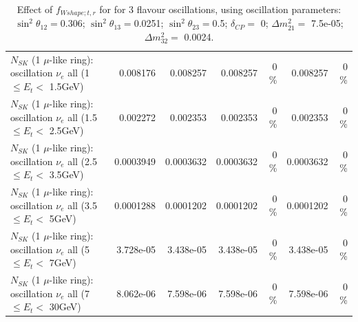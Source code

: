 \begin{table}
\begin{tabular}{| l | r | r | r  r | r  r |}
$N_{SK}$ (1 $\mu$-like ring): oscillation $\nu_{e}$ all (1 $\leq E_{t} <$ 1.5GeV) &        0.008176 &        0.008257 &        0.008257 &        0 \%  &        0.008257 &        0 \%  \\ 
$N_{SK}$ (1 $\mu$-like ring): oscillation $\nu_{e}$ all (1.5 $\leq E_{t} <$ 2.5GeV) &        0.002272 &        0.002353 &        0.002353 &        0 \%  &        0.002353 &        0 \%  \\ 
$N_{SK}$ (1 $\mu$-like ring): oscillation $\nu_{e}$ all (2.5 $\leq E_{t} <$ 3.5GeV) &       0.0003949 &       0.0003632 &       0.0003632 &        0 \%  &       0.0003632 &        0 \%  \\ 
$N_{SK}$ (1 $\mu$-like ring): oscillation $\nu_{e}$ all (3.5 $\leq E_{t} <$ 5GeV) &       0.0001288 &       0.0001202 &       0.0001202 &        0 \%  &       0.0001202 &        0 \%  \\ 
 $N_{SK}$ (1 $\mu$-like ring): oscillation $\nu_{e}$ all (5 $\leq E_{t} <$ 7GeV) &       3.728e-05 &       3.438e-05 &       3.438e-05 &        0 \%  &       3.438e-05 &        0 \%  \\ 
$N_{SK}$ (1 $\mu$-like ring): oscillation $\nu_{e}$ all (7 $\leq E_{t} <$ 30GeV) &       8.062e-06 &       7.598e-06 &       7.598e-06 &        0 \%  &       7.598e-06 &        0 \%  \\ 
\hline
\hline
\end{tabular}
\caption{ Effect of $f_{Wshape; t, r}$ for for 3 flavour oscillations, using oscillation parameters:  $\sin^2\theta_{12} = $0.306; $\sin^2\theta_{13} = $0.0251; $\sin^2\theta_{23} = $0.5; $\delta_{CP} = $        0; $\Delta m^2_{21} = $    7.5e-05; $\Delta m^2_{32} = $    0.0024. }
\label{tab:num_xsec_wshape_1RmuT_3f_osc_t13:0.0251}
\end{table}
\clearpage
